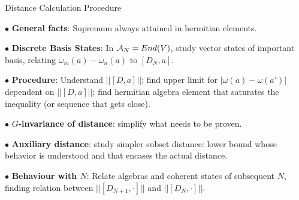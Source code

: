 \begin{frame}{Distance Calculation Procedure} %
    
     $\bullet$ \textbf{General facts}: Supremum always attained in hermitian elements.
     
     $\bullet$ \textbf{Discrete Basis States}: In $\mathcal A_N = End(V)$, study vector states of important basis, relating $\omega_m(a) - \omega_n(a)$ to $[D_N, a]$.
     
     $\bullet$ \textbf{Procedure}: Understand $||[D, a]||$; find upper limit for $|\omega(a) - \omega(a')|$ dependent on $||[D, a]||$; find hermitian algebra element that saturates the inequality (or sequence that gets close). 

    $\bullet$ \textbf{$G$-invariance of distance}: simplify what needs to be proven.
    
    $\bullet$ \textbf{Auxiliary distance}: study simpler subset distance: lower bound whose behavior is understood and that encases the actual distance.
    
    $\bullet$ \textbf{Behaviour with $N$}: Relate algebras and coherent states of subsequent $N$, finding relation between $||[D_{N+1}, \cdot]||$ and $||[D_N, \cdot]||$.
    
\end{frame}